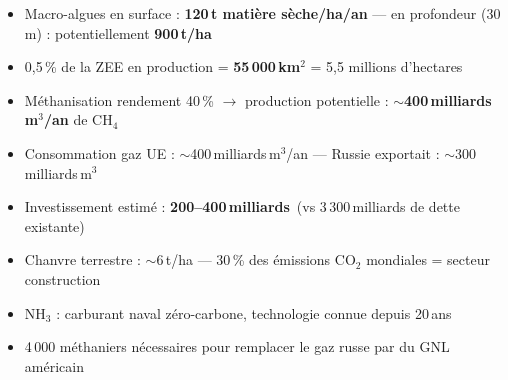 \documentclass[a4paper,11pt]{article}
\newcommand{\stat}[1]{\textbf{\textcolor{ChapColor}{#1}}}
\begin{document}
\begin{center}
\end{center}

\begin{factbox}
\begin{itemize}[nosep, leftmargin=*]
  \item Macro-algues en surface : \stat{120\,t mati\`{e}re s\`{e}che/ha/an} --- en profondeur (30\,m) : potentiellement \stat{900\,t/ha}
  \item 0{,}5\,\% de la ZEE en production = \stat{55\,000\,km$^2$} = 5{,}5 millions d'hectares
  \item M\'{e}thanisation rendement 40\,\% $\rightarrow$ production potentielle : $\sim$\stat{400\,milliards\,m$^3$/an} de CH$_4$
  \item Consommation gaz UE : $\sim$400\,milliards\,m$^3$/an --- Russie exportait : $\sim$300\,milliards\,m$^3$
  \item Investissement estim\'{e} : \stat{200--400\,milliards\,\texteuro} (vs 3\,300\,milliards de dette existante)
  \item Chanvre terrestre : $\sim$6\,t/ha --- 30\,\% des \'{e}missions CO$_2$ mondiales = secteur construction
  \item NH$_3$ : carburant naval z\'{e}ro-carbone, technologie connue depuis 20\,ans
  \item 4\,000 m\'{e}thaniers n\'{e}cessaires pour remplacer le gaz russe par du GNL am\'{e}ricain
\end{itemize}
\end{factbox}

\newpage
\end{document}
